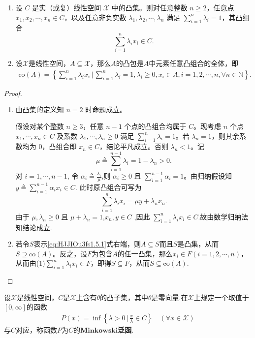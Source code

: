 \documentclass[../../main.tex]{subfiles}%
\begin{document}
\begin{proposition}
\begin{enumerate}[(1)]
\item 设 $C$ 是实（或复）线性空间 $\mathscr{X}$ 中的凸集。则对任意整数 $n \geqslant 2$，任意点 $x_1, x_2, \cdots, x_n \in C$，以及任意非负实数 $\lambda_1, \lambda_2, \cdots, \lambda_n$ 满足 $\sum_{i=1}^n \lambda_i = 1$，其凸组合
\[
\sum_{i=1}^n \lambda_i x_i\in C.
\]

\item 设$\mathscr{X}$是线性空间，$A \subseteq \mathscr{X}$，那么$A$的凸包是$A$中元素任意凸组合的全体，即
\begin{align}
\mathrm{co}(A) = \left\{ \sum\limits_{i=1}^n \lambda_i x_i \,\bigg|\, \sum\limits_{i=1}^n \lambda_i = 1, \lambda_i \geqslant 0, x_i \in A, i = 1, 2, \cdots, n, \forall n \in \mathbb{N} \right\}. \label{eq:HJJIOu3fs1.5.1}
\end{align}
\end{enumerate}
\end{proposition}
\begin{proof}
\begin{enumerate}[(1)]
\item 由凸集的定义知 $n=2$ 时命题成立。

假设对某个整数 $n \geqslant 3$，任意 $n-1$ 个点的凸组合均属于 $C$。现考虑 $n$ 个点 $x_1, \cdots, x_n \in C$ 及系数 $\lambda_1, \cdots, \lambda_n \geqslant 0$ 满足 $\sum_{i=1}^n \lambda_i = 1$。若 $\lambda_n = 1$，则其余系数均为 $0$，凸组合即 $x_n \in C$，结论平凡成立。否则 $\lambda_n < 1$。记
$$
\mu \triangleq \sum_{i=1}^{n-1} \lambda_i = 1 - \lambda_n > 0.
$$
对 $i = 1, \cdots, n-1$, 令 $\alpha_i \triangleq \frac{\lambda_i}{\mu}$,则 $\alpha_i \geqslant 0$ 且 $\sum_{i=1}^{n-1} \alpha_i = 1$。由归纳假设知$y \triangleq \sum_{i=1}^{n-1} \alpha_i x_i\in C$.
此时原凸组合可写为
\[
\sum_{i=1}^n \lambda_i x_i = \mu y + \lambda_n x_n.
\]
由于 $\mu, \lambda_n \geqslant 0$ 且 $\mu + \lambda_n = 1$,$x_n,y \in C$ ,因此 $\sum_{i=1}^n \lambda_i x_i \in C$.故由数学归纳法知结论成立.

\item 若令$S$表示\eqref{eq:HJJIOu3fs1.5.1}式右端，则$A \subseteq S$而且$S$是凸集，从而$S \supseteq \mathrm{co}(A)$。反之，设$F$为包含$A$的任一凸集，那么$x_i \in F(i = 1, 2, \cdots, n)$，从而由(1)$\sum\limits_{i=1}^n \lambda_i x_i \in F$，即得$S \subseteq F$，从而$S \subseteq \mathrm{co}(A)$.
\end{enumerate}
\end{proof}

\begin{definition}
设$\mathscr{X}$是线性空间，$C$是$\mathscr{X}$上含有$\theta$的凸子集，其中$\theta$是零向量.在$\mathscr{X}$上规定一个取值于$[0, \infty]$的函数
\begin{align}
P(x) = \inf \left\{ \lambda > 0 \,\bigg|\, \frac{x}{\lambda} \in C \right\} \quad (\forall x \in \mathscr{X}) \label{eq:HJJIOu3fs1.5.2}
\end{align}
与$C$对应，称函数$P$为$C$的$\mathbf{Minkowski}$\textbf{泛函}.
\end{definition}
\end{document}
